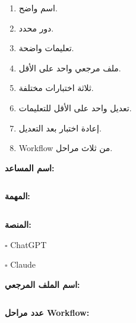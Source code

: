 \documentclass[a4paper]{article}
\begin{document}
\begin{enumerate}

    \item اسم واضح.

    \item دور محدد.

    \item تعليمات واضحة.

    \item ملف مرجعي واحد على الأقل.

    \item ثلاثة اختبارات مختلفة.

    \item تعديل واحد على الأقل للتعليمات.

    \item إعادة اختبار بعد التعديل.

    \item Workflow من ثلاث مراحل.

\end{enumerate}

\textbf{اسم المساعد:}

\[
\boxed{\hspace{15cm}}
\]

\textbf{المهمة:}

\[
\boxed{\hspace{15cm}}
\]

\textbf{المنصة:}

\begin{center}

$\square$ \textenglish{ChatGPT}

\hspace{2cm}

$\square$ \textenglish{Claude}

\end{center}

\textbf{اسم الملف المرجعي:}

\[
\boxed{\hspace{15cm}}
\]

\textbf{عدد مراحل Workflow:}

\[
\boxed{\hspace{5cm}}
\]


\end{document}
